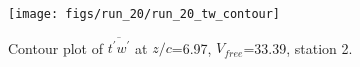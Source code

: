 \begin{figure}[H]
\centering
\texttt{[image: figs/run\_20/run\_20\_tw\_contour]}
\caption{Contour plot of $\overline{t^\prime w^\prime}$ at $z/c$=6.97, $V_{free}$=33.39, station 2.}
\label{fig:run_20_tw_contour}
\end{figure}


